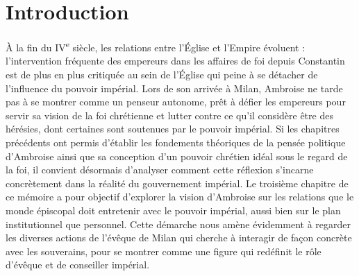 \section*{Introduction}

À la fin du IV\textsuperscript{e} siècle, les relations entre l'Église et l'Empire évoluent : l'intervention fréquente des empereurs dans les affaires de foi depuis Constantin est de plus en plus critiquée au sein de l'Église qui peine à se détacher de l'influence du pouvoir impérial. Lors de son arrivée à Milan, Ambroise ne tarde pas à se montrer comme un penseur autonome, prêt à défier les empereurs pour servir sa vision de la foi chrétienne et lutter contre ce qu'il considère être des hérésies, dont certaines sont soutenues par le pouvoir impérial. Si les chapitres précédents ont permis d'établir les fondements théoriques de la pensée politique d'Ambroise ainsi que sa conception d'un pouvoir chrétien idéal sous le regard de la foi, il convient désormais d'analyser comment cette réflexion s'incarne concrètement dans la réalité du gouvernement impérial. Le troisième chapitre de ce mémoire a pour objectif d'explorer la vision d'Ambroise sur les relations que le monde épiscopal doit entretenir avec le pouvoir impérial, aussi bien sur le plan institutionnel que personnel. Cette démarche nous amène évidemment à regarder les diverses actions de l'évêque de Milan qui cherche à interagir de façon concrète avec les souverains, pour se montrer comme une figure qui redéfinit le rôle d'évêque et de conseiller impérial.

\bigskip

